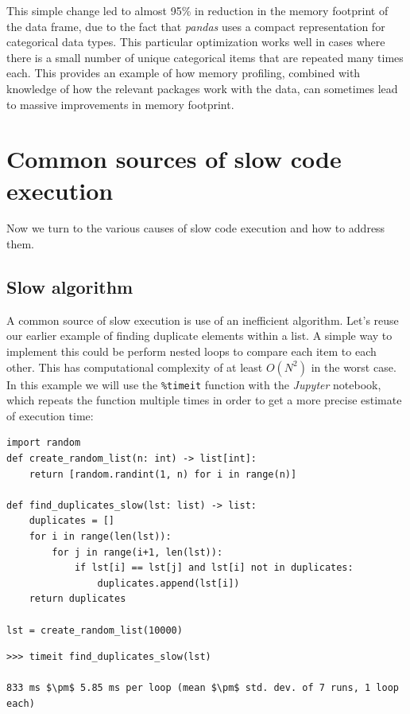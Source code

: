 This simple change led to almost 95\% in reduction in the memory footprint of the data frame, due to the fact that \textit{pandas} uses a compact representation for categorical data types. This particular optimization works well in cases where there is a small number of unique categorical items that are repeated many times each.   This provides an example of how memory profiling, combined with knowledge of how the relevant packages work with the data, can sometimes lead to massive improvements in memory footprint.

\section{Common sources of slow code execution}

Now we turn to the various causes of slow code execution and how to address them.

\subsection{Slow algorithm}

A common source of slow execution is use of an inefficient algorithm.  Let's reuse our earlier example of finding duplicate elements within a list.  A simple way to implement this could be perform nested loops to compare each item to each other.  This has computational complexity of at least $O(N^2)$ in the worst case.  In this example we will use the \texttt{\%timeit} function with the \textit{Jupyter} notebook, which repeats the function multiple times in order to get a more precise estimate of execution time:

\begin{lstlisting}[style=Python]
import random
def create_random_list(n: int) -> list[int]:
    return [random.randint(1, n) for i in range(n)]

def find_duplicates_slow(lst: list) -> list:
    duplicates = []
    for i in range(len(lst)):
        for j in range(i+1, len(lst)):
            if lst[i] == lst[j] and lst[i] not in duplicates:
                duplicates.append(lst[i])
    return duplicates

lst = create_random_list(10000)
\end{lstlisting}

\begin{lstlisting}[style=replshort, mathescape=true]
>>> timeit find_duplicates_slow(lst)

833 ms $\pm$ 5.85 ms per loop (mean $\pm$ std. dev. of 7 runs, 1 loop each)
\end{lstlisting}

